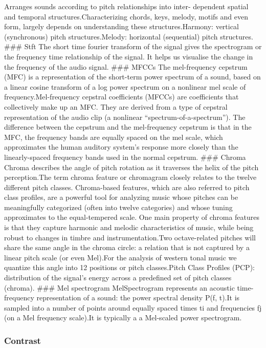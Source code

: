 \documentclass[11pt]{article}
\begin{document}
Arranges sounds according to pitch relationships into inter- dependent
spatial and temporal structures.Characterizing chords, keys, melody,
motifs and even form, largely depends on understanding these
structures.Harmony: vertical (synchronous) pitch structures.Melody:
horizontal (sequential) pitch structures. \#\#\# Stft The short time
fourier transform of the signal gives the spectrogram or the frequency
time relationship of the signal. It helps us visualise the change in the
frequency of the audio signal. \#\#\# MFCCs The mel-frequency cepstrum
(MFC) is a representation of the short-term power spectrum of a sound,
based on a linear cosine transform of a log power spectrum on a
nonlinear mel scale of frequency.Mel-frequency cepstral coefficients
(MFCCs) are coefficients that collectively make up an MFC. They are
derived from a type of cepstral representation of the audio clip (a
nonlinear ``spectrum-of-a-spectrum''). The difference between the
cepstrum and the mel-frequency cepstrum is that in the MFC, the
frequency bands are equally spaced on the mel scale, which approximates
the human auditory system's response more closely than the
linearly-spaced frequency bands used in the normal cepstrum. \#\#\#
Chroma Chroma describes the angle of pitch rotation as it traverses the
helix of the pitch perception.The term chroma feature or chromagram
closely relates to the twelve different pitch classes. Chroma-based
features, which are also referred to pitch class profiles, are a
powerful tool for analyzing music whose pitches can be meaningfully
categorized (often into twelve categories) and whose tuning approximates
to the equal-tempered scale. One main property of chroma features is
that they capture harmonic and melodic characteristics of music, while
being robust to changes in timbre and instrumentation.Two octave-related
pitches will share the same angle in the chroma circle: a relation that
is not captured by a linear pitch scale (or even Mel).For the analysis
of western tonal music we quantize this angle into 12 positions or pitch
classes.Pitch Class Profiles (PCP): distribution of the signal's energy
across a predefined set of pitch classes (chroma). \#\#\# Mel
spectrogram MelSpectrogram represents an acoustic time-frequency
representation of a sound: the power spectral density P(f, t).It is
sampled into a number of points around equally spaced times ti and
frequencies fj (on a Mel frequency scale).It is typically a a Mel-scaled
power spectrogram.

\hypertarget{contrast}{%
\subsubsection{\texorpdfstring{Contrast}{Contrast }}\label{contrast}}
\end{document}
